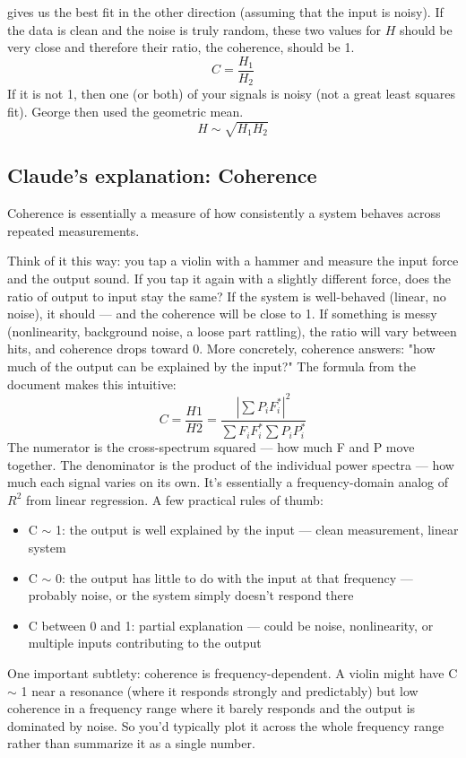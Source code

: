 \documentclass[11pt, oneside]{article}   	%
\begin{document}
gives us the best fit in the other direction (assuming that the input is noisy).  If the data is clean and the noise is truly random, these two values for $H$ should be very close and therefore their ratio, the coherence, should be 1.
\begin{equation}
C = \frac{H_1}{H_2}
\end{equation}
If it is not 1, then one (or both) of your signals is noisy (not a great least squares fit). George then used the geometric mean.
\begin{equation}
H\sim \sqrt{H_1 H_2}
\end{equation}

\subsection{Claude's explanation: Coherence}
Coherence is essentially a measure of how consistently a system behaves across repeated measurements.

Think of it this way: you tap a violin with a hammer and measure the input force and the output sound. If you tap it again with a slightly different force, does the ratio of output to input stay the same? If the system is well-behaved (linear, no noise), it should — and the coherence will be close to 1. If something is messy (nonlinearity, background noise, a loose part rattling), the ratio will vary between hits, and coherence drops toward 0.
More concretely, coherence answers: "how much of the output can be explained by the input?"
The formula from the document makes this intuitive:
\begin{equation}
C = \frac{H1}{H2}=\frac{|\sum P_i F_i^*|^2}{\sum F_i F_i^*  \sum P_i P_i^*}
\end{equation}
The numerator is the cross-spectrum squared — how much F and P move together. The denominator is the product of the individual power spectra — how much each signal varies on its own. It's essentially a frequency-domain analog of $R^2$ from linear regression.
A few practical rules of thumb:
\begin{itemize}
\item C $\sim$ 1: the output is well explained by the input — clean measurement, linear system
\item C $\sim$ 0: the output has little to do with the input at that frequency — probably noise, or the system simply doesn't respond there
\item C between 0 and 1: partial explanation — could be noise, nonlinearity, or multiple inputs contributing to the output
\end{itemize}
One important subtlety: coherence is frequency-dependent. A violin might have C $\sim$ 1 near a resonance (where it responds strongly and predictably) but low coherence in a frequency range where it barely responds and the output is dominated by noise. So you'd typically plot it across the whole frequency range rather than summarize it as a single number.
\end{document}
